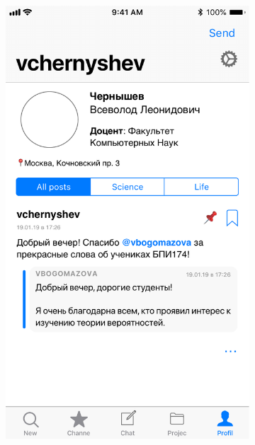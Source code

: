 \documentclass[a4paper,12pt]{article}
\begin{document}
\begin{figure}[h!]
\begin{subfigure}[b]{0.3\linewidth}
			\includegraphics[width=\linewidth]{../includes/prototype/5.pdf}
		\end{subfigure}
		\begin{subfigure}[b]{0.3\linewidth}

\end{subfigure}
\end{figure}
\end{document}
